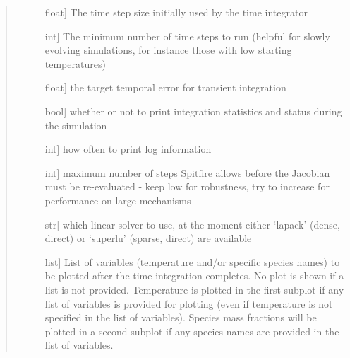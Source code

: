 \documentclass[letterpaper,10pt,english]{sphinxmanual}
\begin{document}
\begin{fulllineitems}
\begin{fulllineitems}
\begin{quote}
\begin{description}
\begin{description}
\item[{}] \leavevmode{[}float{]}
The time step size initially used by the time integrator

\item[{}] \leavevmode{[}int{]}
The minimum number of time steps to run (helpful for slowly evolving simulations, for instance those with low starting temperatures)

\item[{}] \leavevmode{[}float{]}
the target temporal error for transient integration

\item[{}] \leavevmode{[}bool{]}
whether or not to print integration statistics and status during the simulation

\item[{}] \leavevmode{[}int{]}
how often to print log information

\item[{}] \leavevmode{[}int{]}
maximum number of steps Spitfire allows before the Jacobian must be re-evaluated - keep low for robustness, try to increase for performance on large mechanisms

\item[{}] \leavevmode{[}str{]}
which linear solver to use, at the moment either ‘lapack’ (dense, direct) or ‘superlu’ (sparse, direct) are available

\item[{}] \leavevmode{[}list{]}
List of variables (temperature and/or specific species names) to be plotted after the time integration completes.
No plot is shown if a list is not provided.
Temperature is plotted in the first subplot if any list of variables is provided for plotting (even if temperature is not specified in the list of variables).
Species mass fractions will be plotted in a second subplot if any species names are provided in the list of variables.

\end{description}

\end{description}\end{quote}

\end{fulllineitems}


\end{fulllineitems}
\end{document}
